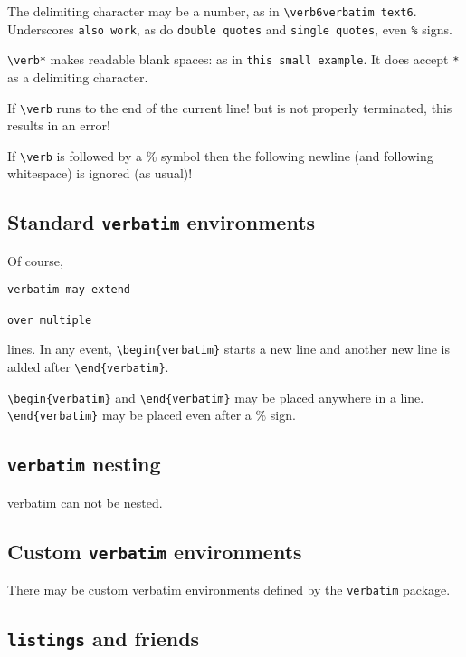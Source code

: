\documentclass[a4paper]{article}
\begin{document}
The delimiting character may be a number, as in \verb!\verb6verbatim text6!.
Underscores \verb_also work_, as do \verb"double quotes" and \verb'single quotes',
even \verb!%! signs.

\verb!\verb*! makes readable blank spaces:
as in \verb*+this small example+. It does accept \texttt{*} as a delimiting character.

If \verb!\verb! runs to the end of the current line!
but is not properly terminated, this results in an error!

If \verb!\verb! is followed by a \% symbol
   then the following newline (and following whitespace) is ignored (as usual)!



\subsection{Standard \texttt{verbatim} environments}

Of course, \begin{verbatim}verbatim may extend 

over multiple\end{verbatim}
lines.
In any event, \verb!\begin{verbatim}! starts a new line and another
new line is added after \verb!\end{verbatim}!.

\verb!\begin{verbatim}! and \verb!\end{verbatim}! may be placed
anywhere in a line.
\verb!\end{verbatim}! may be placed even after a \% sign.


\subsection{\texttt{verbatim} nesting}

verbatim can not be nested.


\subsection{Custom \texttt{verbatim} environments}
There may be custom verbatim environments defined by the \verb!verbatim! package.



\subsection{\texttt{listings} and friends}
\end{document}
